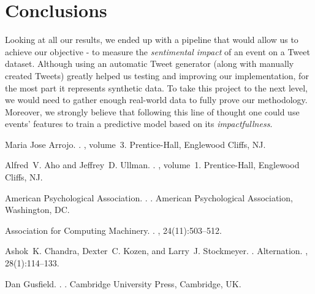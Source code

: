 \documentclass[11pt]{article}
\begin{document}
	\section{Conclusions}
	Looking at all our results, we ended up with a pipeline that would allow us to achieve our objective - to measure the \textit{sentimental impact} of an event on a Tweet dataset. Although using an automatic Tweet generator (along with manually created Tweets) greatly helped us testing and improving our implementation, for the most part it represents synthetic data. To take this project to the next level, we would need to gather enough real-world data to fully prove our methodology. Moreover, we strongly believe that following this line of thought one could use events' features to train a predictive model based on its \textit{impactfullness}.
	
	\newpage
	
	\begin{thebibliography}{}
		
		Maria Jose Arrojo.
		.
		, volume~3.
		\newblock Prentice-{Hall}, Englewood Cliffs, NJ.
		
		Alfred~V. Aho and Jeffrey~D. Ullman.
		.
		, volume~1.
		\newblock Prentice-{Hall}, Englewood Cliffs, NJ.
		
		{American Psychological Association}.
		.
		.
		\newblock American Psychological Association, Washington, DC.
		
		{Association for Computing Machinery}.
		.
		, 24(11):503--512.
		
		Ashok~K. Chandra, Dexter~C. Kozen, and Larry~J. Stockmeyer.
		.
		\newblock Alternation.
		,
		28(1):114--133.
		
		Dan Gusfield.
		.
		.
		\newblock Cambridge University Press, Cambridge, UK.
		
	\end{thebibliography}
	
\end{document}
